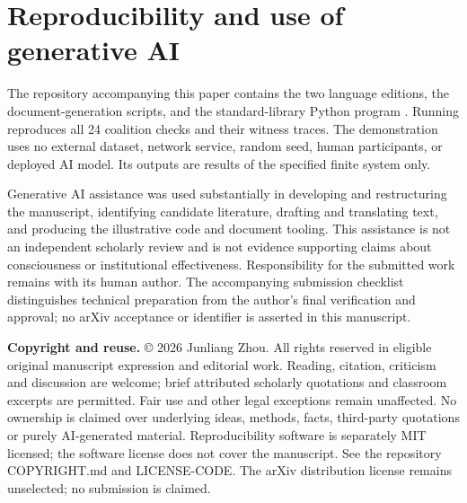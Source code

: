 \documentclass[11pt,a4paper]{article}
\begin{document}
\hypertarget{section-14}{%
\section{Reproducibility and use of generative AI}\label{section-14}}

The repository accompanying this paper contains the two language editions, the document-generation scripts, and the standard-library Python program . Running  reproduces all 24 coalition checks and their witness traces. The demonstration uses no external dataset, network service, random seed, human participants, or deployed AI model. Its outputs are results of the specified finite system only.

Generative AI assistance was used substantially in developing and restructuring the manuscript, identifying candidate literature, drafting and translating text, and producing the illustrative code and document tooling. This assistance is not an independent scholarly review and is not evidence supporting claims about consciousness or institutional effectiveness. Responsibility for the submitted work remains with its human author. The accompanying submission checklist distinguishes technical preparation from the author's final verification and approval; no arXiv acceptance or identifier is asserted in this manuscript.

\textbf{Copyright and reuse.} © 2026 Junliang Zhou. All rights reserved in eligible original manuscript expression and editorial work. Reading, citation, criticism and discussion are welcome; brief attributed scholarly quotations and classroom excerpts are permitted. Fair use and other legal exceptions remain unaffected. No ownership is claimed over underlying ideas, methods, facts, third-party quotations or purely AI-generated material. Reproducibility software is separately MIT licensed; the software license does not cover the manuscript. See the repository COPYRIGHT.md and LICENSE-CODE. The arXiv distribution license remains unselected; no submission is claimed.
\end{document}
